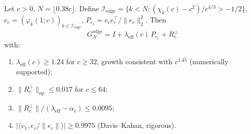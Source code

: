 
\begin{theorem}
\label{thm:boundary_resonance}

Let $c > 0$, $N = \lfloor 0.38c\rfloor$.
Define
$\mathcal{I}_{\mathrm{edge}}
  = \{k < N : (\chi_k(c)-c^2)/c^{4/3} > -1/2\}$,
$e_c = (\varphi_k(1;c))_{k\in\mathcal{I}_{\mathrm{edge}}}$,
$P_{e_c} = e_c e_c^\top / \|e_c\|_2^2$.
Then
\[
  G_N^{\mathrm{edge}} = I + \lambda_{\mathrm{eff}}(c)\,P_{e_c} + R_c^\perp
\]
with:
\begin{enumerate}[\rm(i)]
\item $\lambda_{\mathrm{eff}}(c) \ge 1.24$ for $c \ge 32$,
  growth consistent with $c^{1.45}$ (numerically supported);
\item $\|R_c^\perp\|_{\mathrm{op}} \le 0.017$ for $c \le 64$;
\item $\|R_c^\perp\| / (\lambda_{\mathrm{eff}} - \alpha_c) \le 0.0095$;
\item $|\langle v_1, e_c/\|e_c\|\rangle| \ge 0.9975$
  (Davis--Kahan, rigorous).
\end{enumerate}
\end{theorem}
